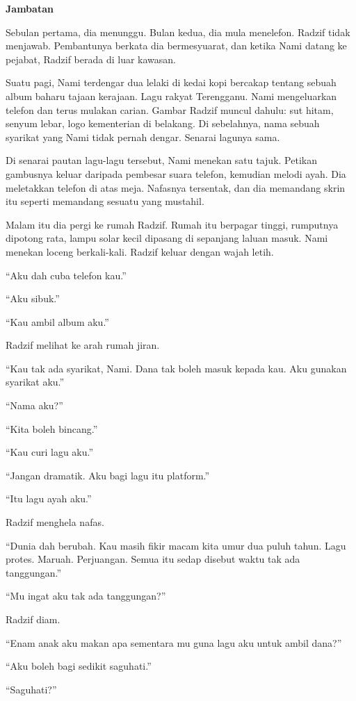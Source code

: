 \documentclass[
  11pt,
  a5paper,
  openany,
  oneside]{book}
\begin{document}
\textbf{Jambatan}

Sebulan pertama, dia menunggu. Bulan kedua, dia mula menelefon. Radzif
tidak menjawab. Pembantunya berkata dia bermesyuarat, dan ketika Nami
datang ke pejabat, Radzif berada di luar kawasan.

Suatu pagi, Nami terdengar dua lelaki di kedai kopi bercakap tentang
sebuah album baharu tajaan kerajaan. Lagu rakyat Terengganu. Nami
mengeluarkan telefon dan terus mulakan carian. Gambar Radzif muncul
dahulu: sut hitam, senyum lebar, logo kementerian di belakang. Di
sebelahnya, nama sebuah syarikat yang Nami tidak pernah dengar. Senarai
lagunya sama.

Di senarai pautan lagu-lagu tersebut, Nami menekan satu tajuk. Petikan
gambusnya keluar daripada pembesar suara telefon, kemudian melodi ayah.
Dia meletakkan telefon di atas meja. Nafasnya tersentak, dan dia
memandang skrin itu seperti memandang sesuatu yang mustahil.

Malam itu dia pergi ke rumah Radzif. Rumah itu berpagar tinggi,
rumputnya dipotong rata, lampu solar kecil dipasang di sepanjang laluan
masuk. Nami menekan loceng berkali-kali. Radzif keluar dengan wajah
letih.

``Aku dah cuba telefon kau.''

``Aku sibuk.''

``Kau ambil album aku.''

Radzif melihat ke arah rumah jiran.

``Kau tak ada syarikat, Nami. Dana tak boleh masuk kepada kau. Aku
gunakan syarikat aku.''

``Nama aku?''

``Kita boleh bincang.''

``Kau curi lagu aku.''

``Jangan dramatik. Aku bagi lagu itu platform.''

``Itu lagu ayah aku.''

Radzif menghela nafas.

``Dunia dah berubah. Kau masih fikir macam kita umur dua puluh tahun.
Lagu protes. Maruah. Perjuangan. Semua itu sedap disebut waktu tak ada
tanggungan.''

``Mu ingat aku tak ada tanggungan?''

Radzif diam.

``Enam anak aku makan apa sementara mu guna lagu aku untuk ambil dana?''

``Aku boleh bagi sedikit saguhati.''

``Saguhati?''
\end{document}
